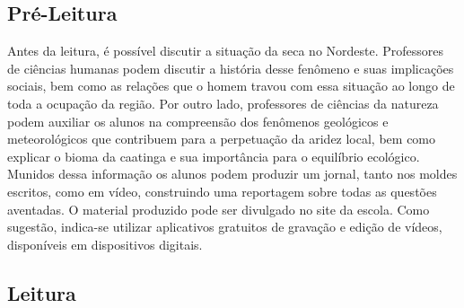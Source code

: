 \documentclass[12pt]{extarticle}
\begin{document}
\subsection{Pré-Leitura}


Antes da leitura, é possível discutir a situação da seca no
Nordeste. Professores de ciências humanas podem discutir a história
desse fenômeno e suas implicações sociais, bem como as relações que o
homem travou com essa situação ao longo de toda a ocupação da região.
Por outro lado, professores de ciências da natureza podem auxiliar os
alunos na compreensão dos fenômenos geológicos e meteorológicos que
contribuem para a perpetuação da aridez local, bem como explicar o bioma
da caatinga e sua importância para o equilíbrio ecológico. Munidos dessa
informação os alunos podem produzir um jornal, tanto nos moldes
escritos, como em vídeo, construindo uma reportagem sobre todas as
questões aventadas. O material produzido pode ser divulgado no site da
escola. Como sugestão, indica-se utilizar aplicativos gratuitos de
gravação e edição de vídeos, disponíveis em dispositivos digitais.


\subsection{Leitura}
\end{document}
